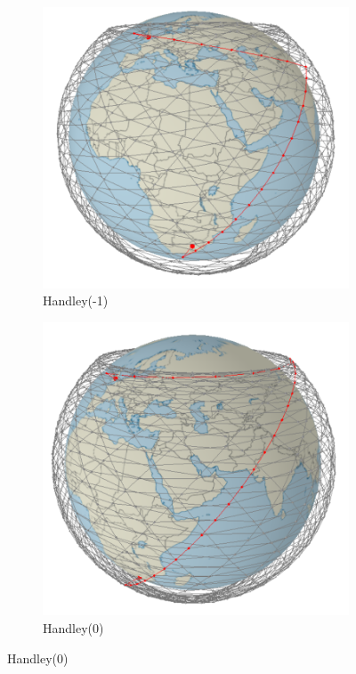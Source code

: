 \documentclass[12pt,a4paper,twoside,openright]{report}
\begin{document}
\begin{figure}
	\centering
	\caption{London - Johannesburg path under different linking methods}
	\label{fig:Screenshots of LDN-JHB}
	\begin{subfigure}[b]{0.4\textwidth}
		\caption{Handley(-1)}
		\includegraphics[width=\textwidth]{LDN-JHB-H-1-1}
	\end{subfigure}
	\hfill
	\begin{subfigure}[b]{0.4\textwidth}
		\caption{Handley(0)}
		\includegraphics[width=\textwidth]{LDN-JHB-H0-1}
	\end{subfigure}
	

\end{figure}
\end{document}
